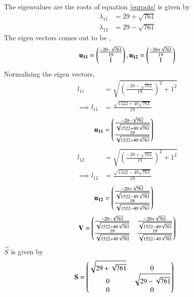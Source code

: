 \documentclass[journal,12pt,twocolumn]{IEEEtran}
\begin{document}
The eigenvalues are the roots of equation \ref{eqroots} is given by 
\begin{align}
    \lambda_{11}&=29+\sqrt{761}\label{eqeig1}\\
    \lambda_{12}&=29-\sqrt{761}\label{eqeig2}
\end{align}
The eigen vectors comes out to be , 
\begin{align}
    \mathbf{u_{11}}=\begin{pmatrix}\frac{-20-\sqrt{761}}{19}\\1\end{pmatrix},
    \mathbf{u_{12}}=\begin{pmatrix}\frac{-20+\sqrt{761}}{19}\\1\end{pmatrix}
\end{align}
Normalising the eigen vectors, 
\begin{align}
    l_{11}&=\sqrt{\left(\frac{-20-\sqrt{761}}{19}\right)^2+1^2}\\
    \implies l_{11}&=\frac{\sqrt{1522+40\sqrt{761}}}{19}
\end{align}
\begin{align}
    \mathbf{u_{11}}&=\begin{pmatrix}\frac{-20-\sqrt{761}}{\sqrt{1522+40\sqrt{761}}}\\\frac{19}{\sqrt{1522+40\sqrt{761}}}\end{pmatrix}
\end{align}
\begin{align}
    l_{12}&=\sqrt{\left(\frac{-20+\sqrt{761}}{19}\right)^2+1^2}\\
    \implies l_{12}&=\frac{\sqrt{1522-40\sqrt{761}}}{19}
\end{align}
\begin{align}
    \mathbf{u_{12}}&=\begin{pmatrix}\frac{-20+\sqrt{761}}{\sqrt{1522-40\sqrt{761}}}\\\frac{19}{\sqrt{1522-40\sqrt{761}}}\end{pmatrix}
\end{align}
\begin{align}
    \mathbf{V}=\begin{pmatrix}\frac{-20-\sqrt{761}}{\sqrt{1522+40\sqrt{761}}} & \frac{-20+\sqrt{761}}{\sqrt{1522-40\sqrt{761}}}\\\frac{19}{\sqrt{1522+40\sqrt{761}}} & \frac{19}{\sqrt{1522-40\sqrt{761}}}\end{pmatrix}
\end{align}
$\vec{S}$ is given by 
\begin{align}
    \mathbf{S}&=\begin{pmatrix}\sqrt{29+\sqrt{761}}&0\\0&\sqrt{29-\sqrt{761}}\\0&0\end{pmatrix}
\end{align}
\end{document}
